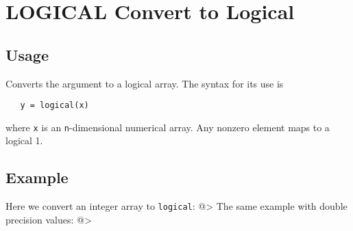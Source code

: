 \section{LOGICAL Convert to Logical}

\subsection{Usage}

Converts the argument to a logical array.  The syntax
for its use is
\begin{verbatim}
   y = logical(x)
\end{verbatim}
where \verb|x| is an \verb|n|-dimensional numerical array.  Any nonzero 
element maps to a logical 1.
\subsection{Example}

Here we convert an integer array to \verb|logical|:
@>
The same example with double precision values:
@>
